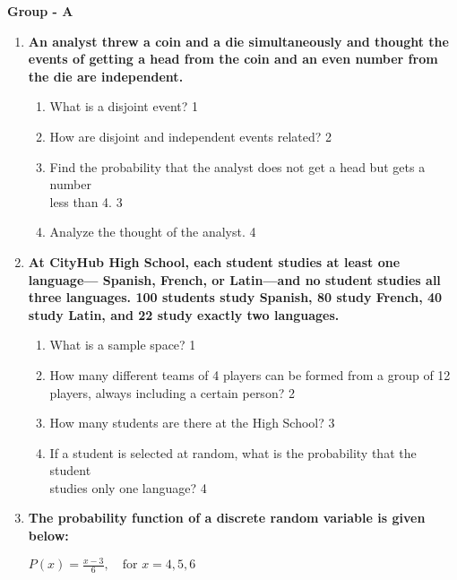 \documentclass[12pt]{article}
\begin{document}
\begin{center}
\textbf{Group  - A}
\end{center}

  \begin{enumerate}
  
   \item
	  \textbf{An analyst threw a coin and a die simultaneously and thought the events of getting a head from the coin and an even number from the die are independent.} 
  
  \begin{enumerate}
    \item
	What is a disjoint event? \hfill 1
    \item
	How are disjoint and independent events related? \hfill 2
    \item  
	Find the probability that the analyst does not get a head but gets a number \\ less than 4. \hfill 3
    \item
	Analyze the thought of the analyst. \hfill 4
  \end{enumerate}
  
     \item
	  \textbf{At CityHub High School, each student studies at least one language— Spanish, French, or Latin—and no student studies all three languages. 100 students study Spanish, 80 study French, 40 study Latin, and 22 study exactly two languages.} 
  
  \begin{enumerate}
    \item What is a sample space? \hfill 1
    \item How many different teams of 4 players can be formed from a group of 12 \\ players, always including a certain person? \hfill 2
    \item  
	How many students are there at the High School? \hfill 3
    \item
	If a student is selected at random, what is the probability that the student \\ studies only one language? \hfill 4
  \end{enumerate}

   \item
	  \textbf{The probability function of a discrete random variable is given below:} 
  
   \begin{center}
  $P(x) = \frac{x - 3}{6}, \quad \text{for } x = 4, 5, 6$
	  \end{center}
  

\end{enumerate}
\end{document}
